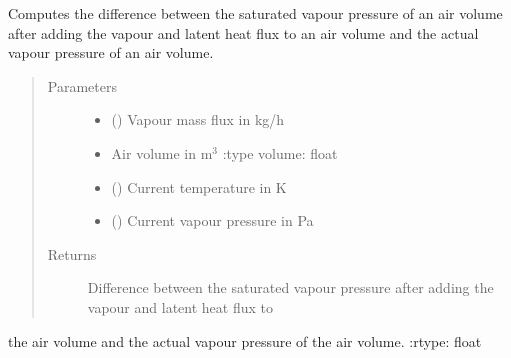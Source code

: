 \documentclass[letterpaper,10pt,english]{sphinxmanual}
\begin{document}

\begin{fulllineitems}
\label{\detokenize{air:livestock.air.max_possible_vapour_flux}}
Computes the difference between the saturated vapour pressure of an air volume after adding the vapour
and latent heat flux to an air volume and the actual vapour pressure of an air volume.
\begin{quote}\begin{description}
\item[{Parameters}] \leavevmode\begin{itemize}
\item {} 
 () \textendash{} Vapour mass flux in kg/h

\item {} 
 \textendash{} Air volume in m$^{\text{3}}$    :type volume: float

\item {} 
 () \textendash{} Current temperature in K

\item {} 
 () \textendash{} Current vapour pressure in Pa

\end{itemize}

\item[{Returns}] \leavevmode
Difference between the saturated vapour pressure after adding the vapour and latent heat flux to

\end{description}\end{quote}

the air volume and the actual vapour pressure of the air volume.
:rtype: float

\end{fulllineitems}

\end{document}
